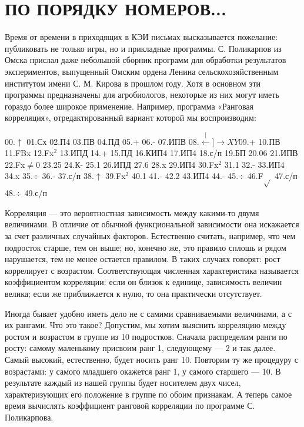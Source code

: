 \documentclass[11pt,a4paper,oneside]{article}
\def\XY{$\stackrel[\leftarrow]{\rightarrow}{XY}$}
\begin{document}
\section{ПО ПОРЯДКУ НОМЕРОВ...}
Время от времени в приходящих в КЭИ письмах высказывается пожелание: публиковать не только игры, но и прикладные программы. С. Поликарпов из Омска прислал даже небольшой сборник программ для обработки результатов экспериментов, выпущенный Омским ордена Ленина сельскохозяйственным институтом имени С. М. Кирова в прошлом году. Хотя в основном эти программы предназначены для агробиологов, некоторые из них могут иметь гораздо более широкое применение. Например, программа «Ранговая корреляция», отредактированный вариант которой мы воспроизводим:

00.$\uparrow$ 01.Сх 02.П4 03.ПВ 04.ПД 05.+ 06.- 07.ИПВ 08.\XY 09.+ 10.ПВ 11.FBx 12.Fx$^{2}$ 13.ИПД 14.+ 15.ПД 16.КИП4
17.ИП4 18.с/п 19.БП 20.06 21.ИПВ 22.Fx$\neq$0 23.25 24.К- 25.1 26.ИПД 27.6 28.x 29.ИП4 30.Fx$^{2}$ 31.1 32.- 33.ИП4 34.x 35.$\div$ 36.- 37.с/п 38.$\uparrow$ 39.Fx$^{2}$ 40.1 41.- 42.2 43.ИП4 44.- 45.$\div$ 46.F$\sqrt{}$ 47.с/п 48.$\div$ 49.с/п

Корреляция — это вероятностная зависимость между какими-то двумя величинами. В отличие от обычной функциональной зависимости она искажается за счет различных случайных факторов. Естественно считать, например, что чем подросток старше, тем он выше; но, конечно же, это правило сплошь и рядом нарушается, тем не менее остается правилом. В таких случаях говорят: рост коррелирует с возрастом. Соответствующая численная характеристика называется коэффициентом корреляции: если он близок к единице, зависимость величин велика; если же приближается к нулю, то она практически отсутствует.

Иногда бывает удобно иметь дело не с самими сравниваемыми величинами, а с их рангами. Что это такое? Допустим, мы хотим выяснить корреляцию между ростом и возрастом в группе из 10 подростков. Сначала распределим ранги по росту: самому маленькому присвоим ранг 1, следующему — 2 и так далее. Самый высокий, естественно, будет носить ранг 10. Повторим ту же процедуру с возрастами: у самого младшего окажется ранг 1, у самого старшего — 10. В результате каждый из нашей группы будет носителем двух чисел, характеризующих его положение в группе по обоим признакам. А теперь самое время вычислять коэффициент ранговой корреляции по программе С. Поликарпова.
\end{document}
